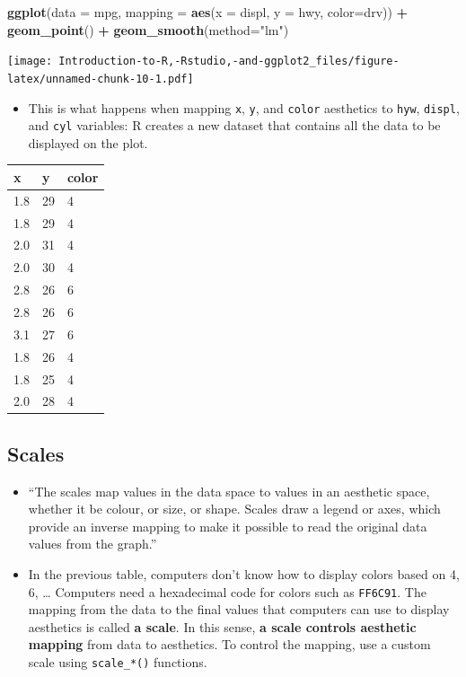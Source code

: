 \documentclass[]{book}
\newenvironment{Shaded}{\begin{snugshade}}{\end{snugshade}}
\newcommand{\DataTypeTok}[1]{\textcolor[rgb]{0.13,0.29,0.53}{#1}}
\newcommand{\KeywordTok}[1]{\textcolor[rgb]{0.13,0.29,0.53}{\textbf{#1}}}
\newcommand{\NormalTok}[1]{#1}
\newcommand{\OperatorTok}[1]{\textcolor[rgb]{0.81,0.36,0.00}{\textbf{#1}}}
\newcommand{\StringTok}[1]{\textcolor[rgb]{0.31,0.60,0.02}{#1}}
\providecommand{\tightlist}{%
  \setlength{\itemsep}{0pt}\setlength{\parskip}{0pt}}
\begin{document}
\begin{Shaded}
\begin{Highlighting}[]
\KeywordTok{ggplot}\NormalTok{(}\DataTypeTok{data =}\NormalTok{ mpg, }\DataTypeTok{mapping =} \KeywordTok{aes}\NormalTok{(}\DataTypeTok{x =}\NormalTok{ displ, }\DataTypeTok{y =}\NormalTok{ hwy, }\DataTypeTok{color=}\NormalTok{drv)) }\OperatorTok{+}\StringTok{ }\KeywordTok{geom_point}\NormalTok{() }\OperatorTok{+}\StringTok{ }\KeywordTok{geom_smooth}\NormalTok{(}\DataTypeTok{method=}\StringTok{"lm"}\NormalTok{)}
\end{Highlighting}
\end{Shaded}

\texttt{[image: Introduction-to-R,-Rstudio,-and-ggplot2\_files/figure-latex/unnamed-chunk-10-1.pdf]}

\begin{itemize}
\tightlist
\item
  This is what happens when mapping \texttt{x}, \texttt{y}, and \texttt{color} aesthetics to \texttt{hyw}, \texttt{displ}, and \texttt{cyl} variables: R creates a new dataset that contains all the data to be displayed on the plot.
\end{itemize}

\begin{longtable}[]{@{}lll@{}}
\toprule
x & y & color\tabularnewline
\midrule
\endhead
1.8 & 29 & 4\tabularnewline
1.8 & 29 & 4\tabularnewline
2.0 & 31 & 4\tabularnewline
2.0 & 30 & 4\tabularnewline
2.8 & 26 & 6\tabularnewline
2.8 & 26 & 6\tabularnewline
3.1 & 27 & 6\tabularnewline
1.8 & 26 & 4\tabularnewline
1.8 & 25 & 4\tabularnewline
2.0 & 28 & 4\tabularnewline
\bottomrule
\end{longtable}

\hypertarget{scales}{%
\subsection{Scales}\label{scales}}

\begin{itemize}
\item
  ``The scales map values in the data space to values in an aesthetic space, whether it be colour, or size, or shape. Scales draw a legend or axes, which provide an inverse mapping to make it possible to read the original data values from the graph.'' \citep{ggplot2}
\item
  In the previous table, computers don't know how to display colors based on 4, 6, \ldots{} Computers need a hexadecimal code for colors such as \texttt{FF6C91}. The mapping from the data to the final values that computers can use to display aesthetics is called \textbf{a scale}. In this sense, \textbf{a scale controls aesthetic mapping} from data to aesthetics. To control the mapping, use a custom scale using \texttt{scale\_*()} functions.
\end{itemize}
\end{document}
